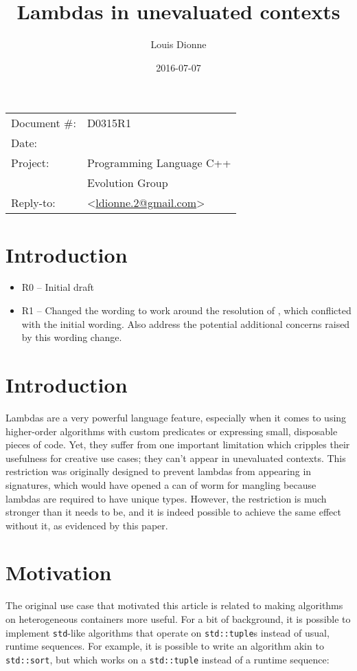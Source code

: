 \documentclass[11pt]{article}
\date{}
\title{Lambdas in unevaluated contexts}
\author{}
\newcommand{\cc}[1]{\texttt{#1}}
\begin{document}
\maketitle\vspace{-2cm}

\begin{flushright}
  \begin{tabular}{ll}
  Document \#:&D0315R1\\
  Date:       &\date{2016-07-07}\\
  Project:    &Programming Language C++\\
              &Evolution Group\\
  Reply-to:   &\author{Louis Dionne} \textless\href{mailto:ldionne.2@gmail.com}{ldionne.2@gmail.com}\textgreater
  \end{tabular}
\end{flushright}

\section{Introduction}
\begin{itemize}
  \item R0 -- Initial draft
  \item R1 -- Changed the wording to work around the resolution of \cite{DR1607},
              which conflicted with the initial wording. Also address the
              potential additional concerns raised by this wording change.
\end{itemize}


\section{Introduction}
Lambdas are a very powerful language feature, especially when it comes to using
higher-order algorithms with custom predicates or expressing small, disposable
pieces of code. Yet, they suffer from one important limitation which cripples
their usefulness for creative use cases; they can't appear in unevaluated
contexts. This restriction was originally designed to prevent lambdas from
appearing in signatures, which would have opened a can of worm for mangling
because lambdas are required to have unique types. However, the restriction is
much stronger than it needs to be, and it is indeed possible to achieve the
same effect without it, as evidenced by this paper.


\section{Motivation}
The original use case that motivated this article is related to making algorithms
on heterogeneous containers more useful. For a bit of background, it is possible
to implement \cc{std}-like algorithms that operate on \cc{std::tuple}s instead of
usual, runtime sequences. For example, it is possible to write an algorithm akin
to \cc{std::sort}, but which works on a \cc{std::tuple} instead of a runtime
sequence:
\end{document}
